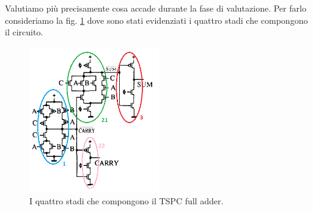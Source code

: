 Valutiamo più precisamente cosa accade durante la fase di valutazione. Per farlo consideriamo la fig. \ref{fig:fig_schemaDaArticoloStadiCerchiati} dove sono stati evidenziati i quattro stadi che compongono il circuito.

\begin{figure}[hbt!]
	\centering
	\includegraphics[width=0.5\textwidth]{figure/SchemaFullAdderTSPC_DaArticolo_ConStadiCerchiati.PNG}
	\caption{I quattro stadi che compongono il TSPC full adder.}
	\label{fig:fig_schemaDaArticoloStadiCerchiati}
\end{figure}

